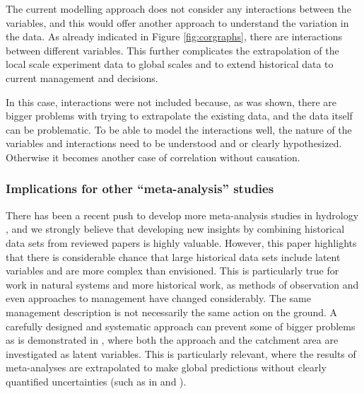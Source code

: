 \documentclass[]{elsarticle} %
\begin{document}
The current modelling approach does not consider any interactions between the variables, and this would offer another approach to understand the variation in the data. As already indicated in Figure \ref{fig:corgraphs}, there are interactions between different variables. This further complicates the extrapolation of the local scale experiment data to global scales and to extend historical data to current management and decisions.

In this case, interactions were not included because, as was shown, there are bigger problems with trying to extrapolate the existing data, and the data itself can be problematic. To be able to model the interactions well, the nature of the variables and interactions need to be understood and or clearly hypothesized. Otherwise it becomes another case of correlation without causation.

\hypertarget{implications-for-other-meta-analysis-studies}{%
\subsubsection{Implications for other ``meta-analysis'' studies}\label{implications-for-other-meta-analysis-studies}}

There has been a recent push to develop more meta-analysis studies in hydrology \citep{wang2020, evaristo2020metaanalysis}, and we strongly believe that developing new insights by combining historical data sets from reviewed papers is highly valuable. However, this paper highlights that there is considerable chance that large historical data sets include latent variables and are more complex than envisioned. This is particularly true for work in natural systems and more historical work, as methods of observation and even approaches to management have changed considerably. The same management description is not necessarily the same action on the ground. A carefully designed and systematic approach can prevent some of bigger problems as is demonstrated in \citet{wang2020}, where both the approach and the catchment area are investigated as latent variables.
This is particularly relevant, where the results of meta-analyses are extrapolated to make global predictions without clearly quantified uncertainties (such as in \citet{hoekvandijke2022} and \citet{wang2020}).
\end{document}
